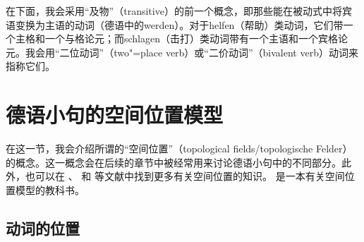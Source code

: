 在下面，我会采用“及物”（transitive）的前一个概念，即那些能在被动式中将宾语变换为主语的动词（\egc 德语中的werden）。对于helfen（帮助）类动词，它们带一个主格和一个与格论元；而schlagen（击打）类动词带有一个主语和一个宾格论元。我会用“二位动词”（two"=place verb）或“二价动词”（bivalent verb）动词来指称它们。

\section{德语小句的空间位置模型}
\label{sec-topo}
\label{Abschnitt-Toplogie}

%
在这一节，我会介绍所谓的“空间位置”（topological fields/topologische Felder）的概念。这一概念会在后续的章节中被经常用来讨论德语小句中的不同部分。此外，也可以在  、 和 等文献中找到更多有关空间位置的知识。 是一本有关空间位置模型的教科书。

\subsection{动词的位置}

